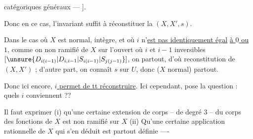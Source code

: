 catégoriques généraux --- ].

Donc en ce cas, l'invariant suffit à réconstituer  la  $(X,X',s)$.

Dans le cas où $X$ est normal, intègre, et où $i$ n'\uline{est pas identiquement égal} \uline{à $0$ ou $1$}, comme on    non ramifié de $X$ sur l'ouvert  où $i$ et $i-1$ inversibles $[\unsure{D_{i(i-1)}|D_{i,i-1}|S_{i(i-1)}|S_{j(j-1)}}]$, on   partout, d'où reconstitution de $(X,X')$ ; d'autre part, on connaît $s$ sur $U$, donc ($X$ normal) partout.

Donc ici encore, \uline{$i$ permet de tt réconstruire}. Ici cependant,  pose la question : quels $i$ conviennent ??

Il faut exprimer (i) qu'une certaine extension de corps -- de degré $3$ -- du corps des fonctions de $X$ est non ramifié sur $X$ (ii) Qu'une certaine application rationnelle de $X$ qui s'en déduit est partout définie ----
